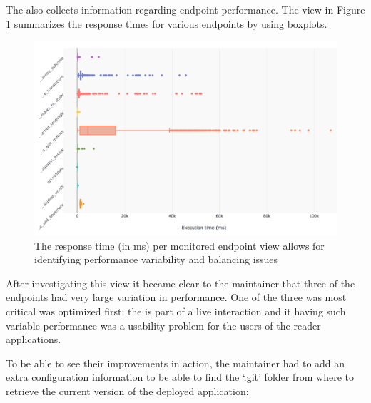 \documentclass[conference]{IEEEtran}
\begin{document}
  The \tool also collects information regarding endpoint performance. The view in Figure \ref{fig:ep} summarizes the response times for various endpoints by using boxplots. 


  \begin{figure}[!ht]
    \centering
    \includegraphics[width=\linewidth]{endpoint_performance.png}
    \caption{The response time (in ms) per monitored endpoint view allows for identifying performance variability and balancing issues}
    \label{fig:ep}
  \end{figure}

  After investigating this view it became clear to the maintainer that three of the endpoints had very large variation in performance. One of the three was most critical was optimized first: the \epTranslations is part of a live interaction and it having such variable performance was a usability problem for the users of the reader applications. 



  \niceseparator

  To be able to see their improvements in action, the maintainer had to add an extra configuration information to be able to find the `.git' folder from where to retrieve the current version of the deployed application: 
\end{document}
